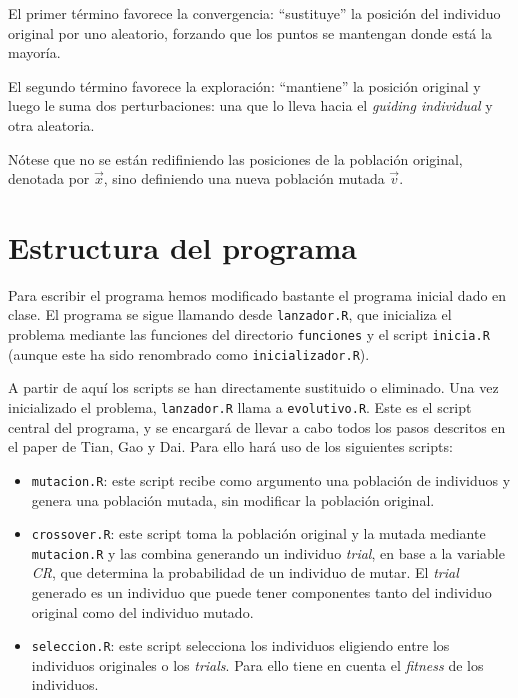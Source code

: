 \documentclass{article}
\begin{document}
El primer término favorece la convergencia: ``sustituye'' la posición del individuo original por uno aleatorio, forzando que los puntos se mantengan donde está la mayoría.

El segundo término favorece la exploración: ``mantiene'' la posición original y luego le suma dos perturbaciones: una que lo lleva hacia el \textit{guiding individual} y otra aleatoria.

Nótese que no se están redifiniendo las posiciones de la población original, denotada por $\vec{x}$, sino definiendo una nueva población mutada $\vec{v}$.
\section{Estructura del programa}
Para escribir el programa hemos modificado bastante el programa inicial dado en clase. El programa se sigue llamando desde \texttt{lanzador.R}, que inicializa el problema mediante las funciones del directorio \texttt{funciones} y el script \texttt{inicia.R} (aunque este ha sido renombrado como \texttt{inicializador.R}).

A partir de aquí los scripts se han directamente sustituido o eliminado. Una vez inicializado el problema, \texttt{lanzador.R} llama a \texttt{evolutivo.R}. Este es el script central del programa, y se encargará de llevar a cabo todos los pasos descritos en el paper de Tian, Gao y Dai\cite{mainPaper}. Para ello hará uso de los siguientes scripts:
\begin{itemize}
    \item \texttt{mutacion.R}: este script recibe como argumento una población de individuos y genera una población mutada, sin modificar la población original.
    \item \texttt{crossover.R}: este script toma la población original y la mutada mediante \texttt{mutacion.R} y las combina generando un individuo \textit{trial}, en base a la variable \textit{CR}, que determina la probabilidad de un individuo de mutar. El \textit{trial} generado es un individuo que puede tener componentes tanto del individuo original como del individuo mutado.
    \item \texttt{seleccion.R}: este script selecciona los individuos eligiendo entre los individuos originales o los \textit{trials}. Para ello tiene en cuenta el \textit{fitness} de los individuos.
\end{itemize}
{}

\end{document}

